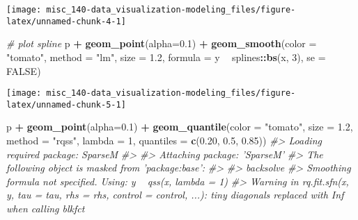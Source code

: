 \documentclass[]{book}
\newenvironment{Shaded}{\begin{snugshade}}{\end{snugshade}}
\newcommand{\CommentTok}[1]{\textcolor[rgb]{0.56,0.35,0.01}{\textit{#1}}}
\newcommand{\DataTypeTok}[1]{\textcolor[rgb]{0.13,0.29,0.53}{#1}}
\newcommand{\DecValTok}[1]{\textcolor[rgb]{0.00,0.00,0.81}{#1}}
\newcommand{\FloatTok}[1]{\textcolor[rgb]{0.00,0.00,0.81}{#1}}
\newcommand{\KeywordTok}[1]{\textcolor[rgb]{0.13,0.29,0.53}{\textbf{#1}}}
\newcommand{\NormalTok}[1]{#1}
\newcommand{\OperatorTok}[1]{\textcolor[rgb]{0.81,0.36,0.00}{\textbf{#1}}}
\newcommand{\OtherTok}[1]{\textcolor[rgb]{0.56,0.35,0.01}{#1}}
\newcommand{\StringTok}[1]{\textcolor[rgb]{0.31,0.60,0.02}{#1}}
\begin{document}
\begin{center}\texttt{[image: misc\_140-data\_visualization-modeling\_files/figure-latex/unnamed-chunk-4-1]} \end{center}

\begin{Shaded}
\begin{Highlighting}[]
\CommentTok{# plot spline}
\NormalTok{p }\OperatorTok{+}\StringTok{ }\KeywordTok{geom_point}\NormalTok{(}\DataTypeTok{alpha=}\FloatTok{0.1}\NormalTok{) }\OperatorTok{+}
\StringTok{    }\KeywordTok{geom_smooth}\NormalTok{(}\DataTypeTok{color =} \StringTok{"tomato"}\NormalTok{, }\DataTypeTok{method =} \StringTok{"lm"}\NormalTok{, }\DataTypeTok{size =} \FloatTok{1.2}\NormalTok{, }
                \DataTypeTok{formula =}\NormalTok{ y }\OperatorTok{~}\StringTok{ }\NormalTok{splines}\OperatorTok{::}\KeywordTok{bs}\NormalTok{(x, }\DecValTok{3}\NormalTok{), }\DataTypeTok{se =} \OtherTok{FALSE}\NormalTok{)}
\end{Highlighting}
\end{Shaded}

\begin{center}\texttt{[image: misc\_140-data\_visualization-modeling\_files/figure-latex/unnamed-chunk-5-1]} \end{center}

\begin{Shaded}
\begin{Highlighting}[]
\NormalTok{p }\OperatorTok{+}\StringTok{ }\KeywordTok{geom_point}\NormalTok{(}\DataTypeTok{alpha=}\FloatTok{0.1}\NormalTok{) }\OperatorTok{+}
\StringTok{    }\KeywordTok{geom_quantile}\NormalTok{(}\DataTypeTok{color =} \StringTok{"tomato"}\NormalTok{, }\DataTypeTok{size =} \FloatTok{1.2}\NormalTok{, }\DataTypeTok{method =} \StringTok{"rqss"}\NormalTok{,}
                  \DataTypeTok{lambda =} \DecValTok{1}\NormalTok{, }\DataTypeTok{quantiles =} \KeywordTok{c}\NormalTok{(}\FloatTok{0.20}\NormalTok{, }\FloatTok{0.5}\NormalTok{, }\FloatTok{0.85}\NormalTok{))}
\CommentTok{#> Loading required package: SparseM}
\CommentTok{#> }
\CommentTok{#> Attaching package: 'SparseM'}
\CommentTok{#> The following object is masked from 'package:base':}
\CommentTok{#> }
\CommentTok{#>     backsolve}
\CommentTok{#> Smoothing formula not specified. Using: y ~ qss(x, lambda = 1)}
\CommentTok{#> Warning in rq.fit.sfn(x, y, tau = tau, rhs = rhs, control = control, ...): tiny diagonals replaced with Inf when calling blkfct}
\end{Highlighting}
\end{Shaded}
\end{document}
